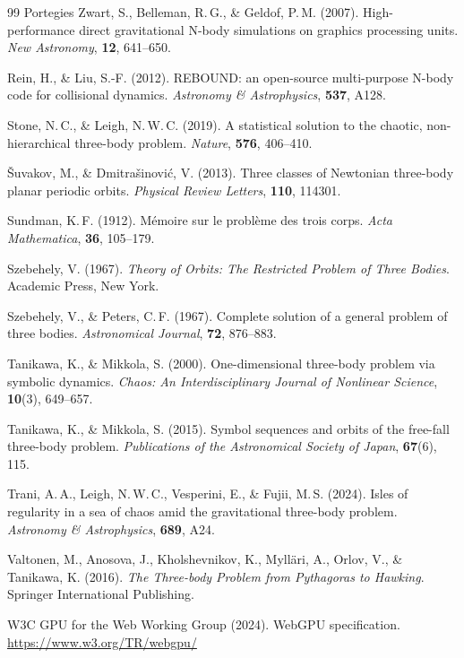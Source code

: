 \documentclass[11pt,a4paper]{article}
\begin{document}
\begin{thebibliography}{99}
Portegies Zwart, S., Belleman, R.\,G., \& Geldof, P.\,M. (2007).
High-performance direct gravitational N-body simulations on graphics processing units.
\textit{New Astronomy}, \textbf{12}, 641--650.

Rein, H., \& Liu, S.-F. (2012).
REBOUND: an open-source multi-purpose N-body code for collisional dynamics.
\textit{Astronomy \& Astrophysics}, \textbf{537}, A128.

Stone, N.\,C., \& Leigh, N.\,W.\,C. (2019).
A statistical solution to the chaotic, non-hierarchical three-body problem.
\textit{Nature}, \textbf{576}, 406--410.

{\v{S}}uvakov, M., \& Dmitra{\v{s}}inovi{\'c}, V. (2013).
Three classes of Newtonian three-body planar periodic orbits.
\textit{Physical Review Letters}, \textbf{110}, 114301.

Sundman, K.\,F. (1912).
M\'{e}moire sur le probl\`{e}me des trois corps.
\textit{Acta Mathematica}, \textbf{36}, 105--179.

Szebehely, V. (1967).
\textit{Theory of Orbits: The Restricted Problem of Three Bodies}.
Academic Press, New York.

Szebehely, V., \& Peters, C.\,F. (1967).
Complete solution of a general problem of three bodies.
\textit{Astronomical Journal}, \textbf{72}, 876--883.

Tanikawa, K., \& Mikkola, S. (2000).
One-dimensional three-body problem via symbolic dynamics.
\textit{Chaos: An Interdisciplinary Journal of Nonlinear Science}, \textbf{10}(3), 649--657.

Tanikawa, K., \& Mikkola, S. (2015).
Symbol sequences and orbits of the free-fall three-body problem.
\textit{Publications of the Astronomical Society of Japan}, \textbf{67}(6), 115.

Trani, A.\,A., Leigh, N.\,W.\,C., Vesperini, E., \& Fujii, M.\,S. (2024).
Isles of regularity in a sea of chaos amid the gravitational three-body problem.
\textit{Astronomy \& Astrophysics}, \textbf{689}, A24.

Valtonen, M., Anosova, J., Kholshevnikov, K., Myll\"{a}ri, A., Orlov, V., \& Tanikawa, K. (2016).
\textit{The Three-body Problem from Pythagoras to Hawking}.
Springer International Publishing.

W3C GPU for the Web Working Group (2024).
WebGPU specification.
\url{https://www.w3.org/TR/webgpu/}


\end{thebibliography}
\end{document}
